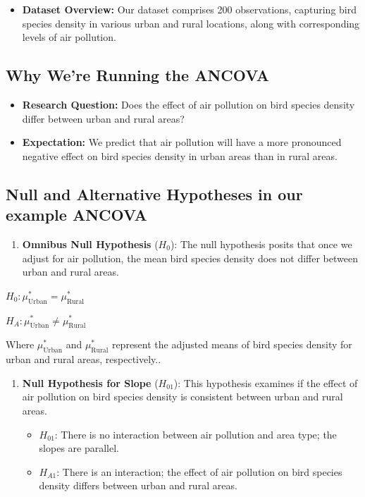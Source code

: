 \documentclass[
  letterpaper,
  DIV=11,
  numbers=noendperiod]{scrreprt}
\providecommand{\tightlist}{%
  \setlength{\itemsep}{0pt}\setlength{\parskip}{0pt}}
\begin{document}
\begin{itemize}
\tightlist
\item
  \textbf{Dataset Overview:} Our dataset comprises 200 observations,
  capturing bird species density in various urban and rural locations,
  along with corresponding levels of air pollution.
\end{itemize}

\subsection{Why We're Running the
ANCOVA}\label{why-were-running-the-ancova}

\begin{itemize}
\item
  \textbf{Research Question:} Does the effect of air pollution on bird
  species density differ between urban and rural areas?
\item
  \textbf{Expectation:} We predict that air pollution will have a more
  pronounced negative effect on bird species density in urban areas than
  in rural areas.
\end{itemize}

\subsection{Null and Alternative Hypotheses in our example
ANCOVA}\label{null-and-alternative-hypotheses-in-our-example-ancova}

\begin{enumerate}
\def\labelenumi{\arabic{enumi}.}
\tightlist
\item
  \textbf{Omnibus Null Hypothesis} (\(H_0\)): The null hypothesis posits
  that once we adjust for air pollution, the mean bird species density
  does not differ between urban and rural areas.
\end{enumerate}

\(H_0: \mu^*_{\text{Urban}} = \mu^*_{\text{Rural}}\)

\(H_A: \mu^*_{\text{Urban}} \neq \mu^*_{\text{Rural}}\)

Where \(\mu^*_{\text{Urban}}\) and \(\mu^*_{\text{Rural}}\) represent
the adjusted means of bird species density for urban and rural areas,
respectively..

\begin{enumerate}
\def\labelenumi{\arabic{enumi}.}
\setcounter{enumi}{1}
\item
  \textbf{Null Hypothesis for Slope} (\(H_{01}\)): This hypothesis
  examines if the effect of air pollution on bird species density is
  consistent between urban and rural areas.

  \begin{itemize}
  \tightlist
  \item
    \(H_{01}\): There is no interaction between air pollution and area
    type; the slopes are parallel.
  \item
    \(H_{A1}\): There is an interaction; the effect of air pollution on
    bird species density differs between urban and rural areas.
  \end{itemize}
\end{enumerate}
\end{document}
